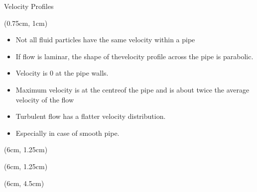 \documentclass[9pt,xcolor={svgnames, x11names},professionalfonts, mathserif]{beamer}
\begin{document}

\begin{frame}{Velocity Profiles}

 \begin{textblock*}{1\columnwidth}(0.75cm, 1cm)
  \begin{itemize}
   \item<1-> Not all fluid particles have the same velocity within a pipe \par\vspace{0.5cm}
   \item<2-> If flow is laminar, the shape of the\newline velocity profile across the pipe is \newline parabolic.

   \item[]<3-> Velocity is $0$ at the pipe walls.
   \item[]<4->Maximum velocity is at the  centre\newline of the pipe and  is about twice the \newline average velocity of the flow
         \par\vspace{1cm}
         \item<5-> Turbulent flow has a flatter \newline velocity distribution.

   \item[]<6-> Especially in case of smooth pipe.

  \end{itemize}
 \end{textblock*}

 \begin{textblock*}{5cm}(6cm, 1.25cm)
 \end{textblock*}

 \begin{textblock*}{5cm}(6cm, 1.25cm)
 \end{textblock*}

 \begin{textblock*}{5cm}(6cm, 4.5cm)
 \end{textblock*}


\end{frame}
\end{document}

